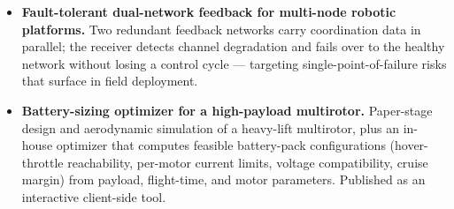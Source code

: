 \documentclass[a4paper,20pt]{article}
\begin{document}
\begin{itemize}[leftmargin=*]
    \item \textbf{Fault-tolerant dual-network feedback for multi-node robotic platforms.} Two redundant feedback networks carry coordination data in parallel; the receiver detects channel degradation and fails over to the healthy network without losing a control cycle --- targeting single-point-of-failure risks that surface in field deployment. \vspace{-5pt}

    \item \textbf{Battery-sizing optimizer for a high-payload multirotor.} Paper-stage design and aerodynamic simulation of a heavy-lift multirotor, plus an in-house optimizer that computes feasible battery-pack configurations (hover-throttle reachability, per-motor current limits, voltage compatibility, cruise margin) from payload, flight-time, and motor parameters. Published as an interactive client-side tool. \vspace{-5pt}

\end{itemize}
\end{document}
